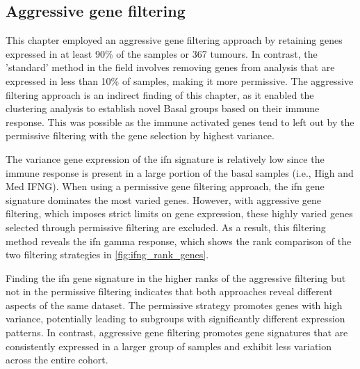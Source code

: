 \subsection*{Aggressive gene filtering}


This chapter employed an aggressive gene filtering approach by retaining genes expressed in at least 90\% of the samples or 367 tumours. In contrast, the 'standard' method in the field involves removing genes from analysis that are expressed in less than 10\% of samples, making it more permissive. The aggressive filtering approach is an indirect finding of this chapter, as it enabled the clustering analysis to establish novel Basal groups based on their immune response. This was possible as the immune activated genes tend to left out by the permissive filtering with the gene selection by highest variance. 

The variance gene expression of the \acrshort{ifn} signature is relatively low since the immune response is present in a large portion of the basal samples (i.e., High and Med IFNG). When using a permissive gene filtering approach, the \acrshort{ifn} gene signature dominates the most varied genes. However, with aggressive gene filtering, which imposes strict limits on gene expression, these highly varied genes selected through permissive filtering are excluded. As a result, this filtering method reveals the \acrlong{ifn} gamma response, which shows the rank comparison of the two filtering strategies in \cref{fig:ifng_rank_genes}.

Finding the \acrlong{ifn} gene signature in the higher ranks of the aggressive filtering but not in the permissive filtering indicates that both approaches reveal different aspects of the same dataset. The permissive strategy promotes genes with high variance, potentially leading to subgroups with significantly different expression patterns. In contrast, aggressive gene filtering promotes gene signatures that are consistently expressed in a larger group of samples and exhibit less variation across the entire cohort.

